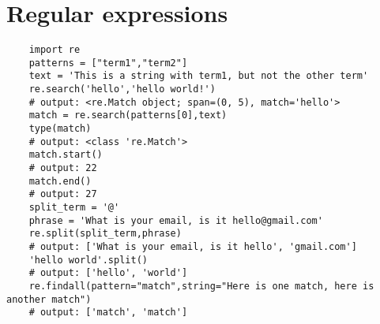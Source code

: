 \section{Regular expressions}
\begin{verbatim}
    import re 
    patterns = ["term1","term2"]
    text = 'This is a string with term1, but not the other term'
    re.search('hello','hello world!')
    # output: <re.Match object; span=(0, 5), match='hello'>
    match = re.search(patterns[0],text)
    type(match)
    # output: <class 're.Match'>
    match.start()
    # output: 22
    match.end()
    # output: 27
    split_term = '@'
    phrase = 'What is your email, is it hello@gmail.com'
    re.split(split_term,phrase)
    # output: ['What is your email, is it hello', 'gmail.com']
    'hello world'.split()
    # output: ['hello', 'world']
    re.findall(pattern="match",string="Here is one match, here is another match")
    # output: ['match', 'match']
\end{verbatim}


